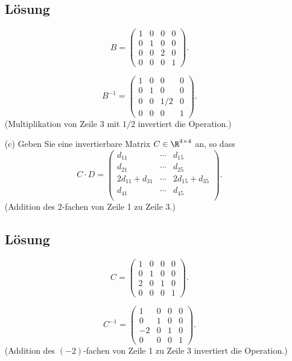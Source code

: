 \begin{itemize}
		\subsection*{L\"osung}
		$$	
			B =
			\begin{pmatrix}
				1	&0	&0	&0	\\
				0	&1	&0	&0	\\
				0	&0	&2	&0	\\
				0	&0	&0	&1	
			\end{pmatrix}.
		$$	
		
		$$	
			B^{-1} =
			\begin{pmatrix}
				1	&0	&0	&0	\\
				0	&1	&0	&0	\\
				0	&0	&1/2	&0	\\
				0	&0	&0	&1	
			\end{pmatrix}.
		$$			
		(Multiplikation von Zeile 3 mit $1/2$ invertiert die Operation.)
	\item[(c)] Geben Sie eine invertierbare Matrix $C\in\R^{4\times 4}$ an, so dass
			$$
				C\cdot D = 
				\begin{pmatrix}
					d_{11} 			&\cdots	&d_{15} \\
					d_{21}			&\cdots	&d_{25}\\		
					2d_{11} + d_{31}	&\cdots	&2d_{15} + d_{35}\\
					d_{41}			&\cdots	&d_{45}\\
				\end{pmatrix}.
			$$
			(Addition des 2-fachen von Zeile 1 zu Zeile 3.)

		\subsection*{L\"osung}
		$$	
			C =
			\begin{pmatrix}
				1	&0	&0	&0	\\
				0	&1	&0	&0	\\
				2	&0	&1	&0	\\
				0	&0	&0	&1	
			\end{pmatrix}.
		$$	
		
		$$	
			C^{-1} =
			\begin{pmatrix}
				1	&0	&0	&0	\\
				0	&1	&0	&0	\\
				-2	&0	&1	&0	\\
				0	&0	&0	&1	
			\end{pmatrix}.
		$$	
		(Addition des $(-2)$-fachen von Zeile 1 zu Zeile 3 invertiert die Operation.)
\end{itemize}

